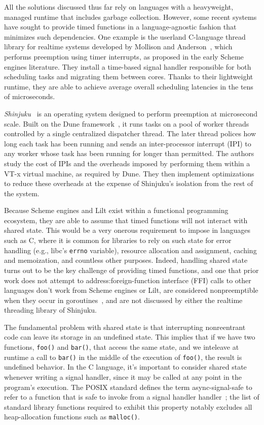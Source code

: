 All the solutions discussed thus far rely on languages with a heavyweight, managed
runtime that includes garbage collection.  However, some recent systems have sought
to provide timed functions in a language-agnostic fashion that minimizes such
dependencies.  One example is the userland C-language thread library for realtime
systems developed by Mollison and Anderson~\cite{mollison:rtas2013}, which performs
preemption using timer interrupts, as proposed in the early Scheme engines
literature.  They install a time-based signal handler responsible for both scheduling
tasks and migrating them between cores.  Thanks to their lightweight runtime, they
are able to achieve average overall scheduling latencies in the tens of microseconds.

\textit{Shinjuku}~\cite{Kaffes:nsdi2019} is an operating system designed to perform
preemption at microsecond scale.  Built on the Dune framework~\cite{Belay:osdi2012},
it runs tasks on a pool of worker threads controlled by a single centralized
dispatcher thread.  The later thread polices how long each task has been running and
sends an inter-processor interrupt (IPI) to any worker whose task has been running
for longer than permitted.  The authors study the cost of IPIs and the overheads
imposed by performing them within a VT-x virtual machine, as required by Dune.  They
then implement optimizations to reduce these overheads at the expense of Shinjuku's
isolation from the rest of the system.

Because Scheme engines and Lilt exist within a functional programming ecosystem, they
are able to assume that timed functions will not interact with shared state.  This
would be a very onerous requirement to impose in languages such as C, where it is
common for libraries to rely on such state for error handling (e.g., libc's
\texttt{errno} variable), resource allocation and assignment, caching and
memoization, and countless other purposes.  Indeed, handling shared state turns out
to be the key challenge of providing timed functions, and one that prior work does
not attempt to address:\@ foreign-function interface (FFI) calls to other languages
don't work from Scheme engines or Lilt, are considered nonpreemptible when they
occur in goroutines~\cite{www-golang-fficall}, and are not discussed by either the
realtime threading library of Shinjuku.

The fundamental problem with shared state is that interrupting nonreentrant code can
leave its storage in an undefined state.  This implies that if we have two functions,
\texttt{foo()} and \texttt{bar()}, that access the same state, and we inteleave at
runtime a call to \texttt{bar()} in the middle of the execution of \texttt{foo()},
the result is undefined behavior.  In the C language, it's important to consider
shared state whenever writing a signal handler, since it may be called at any point
in the program's execution.  The POSIX standard defines the term async-signal-safe to
refer to a function that is safe to invoke from a signal handler
handler~\cite{signal-safety-manpage}; the list of standard library functions required
to exhibit this property notably excludes all heap-allocation functions such as
\texttt{malloc()}.

